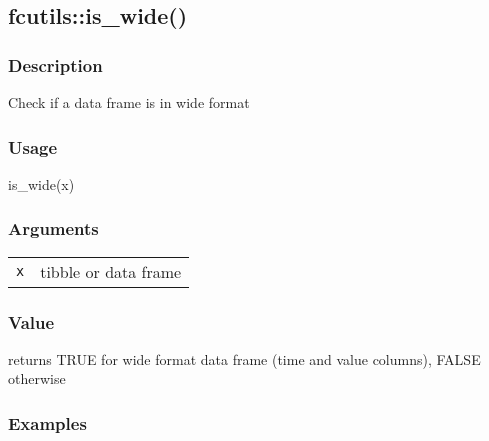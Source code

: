\documentclass[
  letterpaper,
  DIV=11,
  numbers=noendperiod]{scrreport}
\newenvironment{Shaded}{\begin{snugshade}}{\end{snugshade}}
\newcommand{\FunctionTok}[1]{\textcolor[rgb]{0.28,0.35,0.67}{#1}}
\newcommand{\NormalTok}[1]{\textcolor[rgb]{0.00,0.23,0.31}{#1}}
\begin{document}
\subsection{fcutils::is\_wide()}\label{fcutilsis_wide}

\subsubsection{Description}\label{description-53}

Check if a data frame is in wide format

\subsubsection{Usage}\label{usage-53}

\begin{Shaded}
\begin{Highlighting}[]
\FunctionTok{is\_wide}\NormalTok{(x)}
\end{Highlighting}
\end{Shaded}

\subsubsection{Arguments}\label{arguments-53}

\begin{longtable}[]{@{}ll@{}}
\toprule\noalign{}
\endhead
\bottomrule\noalign{}
\endlastfoot
\texttt{x} & tibble or data frame \\
\end{longtable}

\subsubsection{Value}\label{value-53}

returns TRUE for wide format data frame (time and value columns), FALSE
otherwise

\subsubsection{Examples}\label{examples-53}
\end{document}
